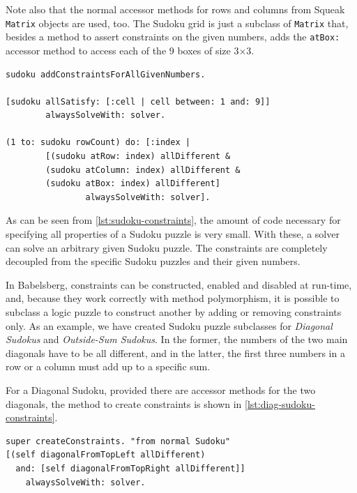 Note also that the normal accessor methods for rows and columns from
Squeak \lstinline!Matrix!  objects are used, too. The Sudoku grid is
just a subclass of \lstinline!Matrix! that, besides a method to assert
constraints on the given numbers, adds the \lstinline!atBox:! accessor
method to access each of the 9 boxes of size 3$\times$3.

\begin{minipage}{1.0\linewidth}
\begin{lstlisting}[caption=All Constraints of a Sudoku Puzzle, label=lst:sudoku-constraints]
sudoku addConstraintsForAllGivenNumbers.

[sudoku allSatisfy: [:cell | cell between: 1 and: 9]] 
		alwaysSolveWith: solver.
		
(1 to: sudoku rowCount) do: [:index |
		[(sudoku atRow: index) allDifferent &
		(sudoku atColumn: index) allDifferent &
		(sudoku atBox: index) allDifferent] 
				alwaysSolveWith: solver].
\end{lstlisting}  
\end{minipage}

As can be seen from \autoref{lst:sudoku-constraints}, the amount of
code necessary for specifying all properties of a Sudoku puzzle is
very small. With these, a solver can solve an arbitrary given Sudoku
puzzle. The constraints are completely decoupled from the specific
Sudoku puzzles and their given numbers.

In Babelsberg, constraints can be constructed, enabled and disabled at
run-time, and, because they work correctly with method polymorphism, it
is possible to subclass a logic puzzle to construct another by adding
or removing constraints only. As an example, we have created Sudoku
puzzle subclasses for \emph{Diagonal Sudokus} and \emph{Outside-Sum
  Sudokus}. In the former, the numbers of the two main diagonals have
to be all different, and in the latter, the first three numbers in a
row or a column must add up to a specific sum.

For a Diagonal Sudoku, provided there are accessor methods for the two
diagonals, the method to create constraints is shown in
\autoref{lst:diag-sudoku-constraints}.
\begin{lstlisting}[caption=The Diagonal Sudoku, label=lst:diag-sudoku-constraints]
super createConstraints. "from normal Sudoku"
[(self diagonalFromTopLeft allDifferent)
  and: [self diagonalFromTopRight allDifferent]]
    alwaysSolveWith: solver.
\end{lstlisting}

